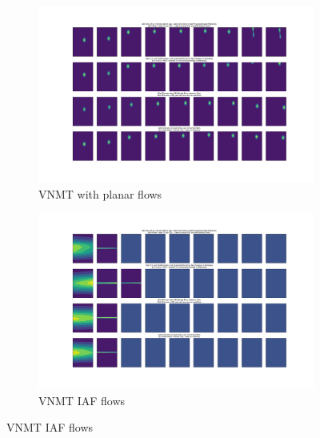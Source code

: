 \begin{figure}
	\centering
	\begin{subfigure}[b]{\textwidth}
		\centering
		\includegraphics[width=\textwidth]{vnmt_planar_flows_plot.pdf}
		\caption{\ac{VNMT} with planar flows}
		\label{fig:vnmt_planar}
	\end{subfigure}
	\hfill
	\begin{subfigure}[b]{\textwidth}
		\centering
		\includegraphics[width=\textwidth]{vnmt_iaf_flows_plot.pdf}
		\caption{\ac{VNMT} \ac{IAF} flows}
		\label{fig:vnmt_iaf}
	\end{subfigure}
\end{figure}